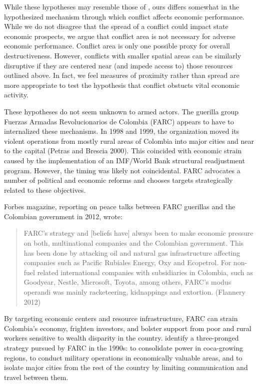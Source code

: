 While these hypotheses may resemble those of \cite{imai:weinstein:2000}, ours differs somewhat in the hypothesized mechanism through which conflict affects economic performance.  While we do not disagree that the spread of a conflict could impact state economic prospects, we argue that conflict area is not necessary for adverse economic performance.  Conflict area is only one possible proxy for overall destructiveness.  However, conflicts with smaller spatial areas can be similarly disruptive if they are centered near (and impede access to) those resources outlined above.  In fact, we feel measures of proximity rather than spread are more appropriate to test the hypothesis that conflict obstucts vital economic activity.

These hypotheses do not seem unknown to armed actors.  The guerilla group Fuerzas Armadas Revolucionarios de Colombia (FARC) appears to have to internalized these mechanisms.  In 1998 and 1999, the organization moved its violent operations from mostly rural areas of Colombia into major cities and near to the capital (Petras and Brescia 2000).  This coincided with economic strain caused by the implementation of an IMF/World Bank structural readjustment program.  However, the timing was likely not coincidental.  FARC advocates a number of political and economic reforms and chooses targets strategically related to these objectives.

Forbes magazine, reporting on peace talks between FARC guerillas and the Colombian government in 2012, wrote: 
\begin{quote}FARC's strategy and [beliefs have] always been to make economic pressure on both, multinational companies and the Colombian government. This has been done by attacking oil and natural gas infrastructure affecting companies such as Pacific Rubiales Energy, Oxy and Ecopetrol. For non-fuel related international companies with subsidiaries in Colombia, such as Goodyear, Nestle, Microsoft, Toyota, among others, FARC’s modus operandi was mainly racketeering, kidnappings and extortion. (Flannery 2012)\end{quote}
By targeting economic centers and resource infrastructure, FARC can strain Colombia's economy, frighten investors, and bolster support from poor and rural workers sensitive to wealth disparity in the country.  \cite{rabasa:chalk:2001} identify a three-pronged strategy pursued by FARC in the 1990s: to consolidate power in coca-growing regions, to conduct military operations in economically valuable areas, and to isolate major cities from the rest of the country by limiting communication and travel between them.    

